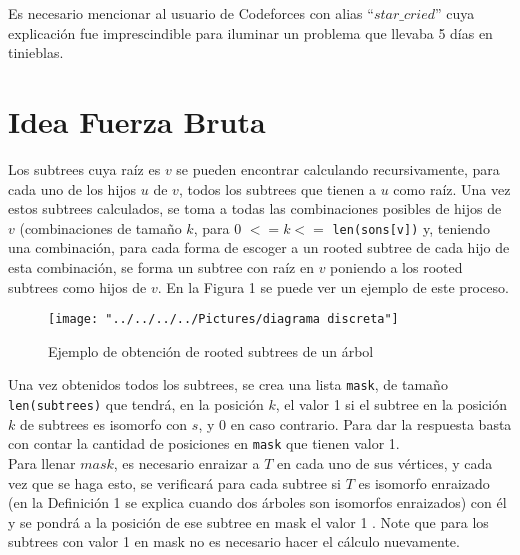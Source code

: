 \documentclass[a4paper,12pt,twocolumn]{article}
\begin{document}
  Es necesario mencionar al usuario de Codeforces con alias $“star\_cried”$ cuya explicación fue imprescindible para iluminar un problema que llevaba 5 días en tinieblas.\\
  
  




 
	\section{Idea Fuerza Bruta}
		Los subtrees cuya raíz es $v$ se pueden encontrar calculando recursivamente, para cada uno de los hijos $u$ de $v$, todos los subtrees que tienen a $u$ como raíz. Una vez estos subtrees calculados, se toma a todas las combinaciones posibles de hijos de $v$ (combinaciones de tamaño $k$, para 0 $<= k <=$ \texttt{\ttfamily len(sons[v])} y, teniendo una combinación, para cada forma de escoger a un rooted subtree de cada hijo de esta combinación, se forma un subtree con raíz en $v$ poniendo a los rooted subtrees como hijos de $v$. En la Figura 1 se puede ver un ejemplo de este proceso.
		
		\begin{figure}
			\centering
			\texttt{[image: "../../../../Pictures/diagrama discreta"]}
			\caption[Figura 1]{Ejemplo de obtención de rooted subtrees de un árbol}
			\label{fig:diagrama-discreta}
		\end{figure}
	
	Una vez obtenidos todos los subtrees, se crea una lista \texttt{\ttfamily mask}, de tamaño \texttt{\ttfamily len(subtrees)} que tendrá, en la posición $k$, el valor 1 si el subtree en la posición $k$ de subtrees es isomorfo con $s$, y 0 en caso contrario. Para dar la respuesta basta con contar la cantidad de posiciones en \texttt{\ttfamily mask} que tienen valor 1.\\
	
	Para llenar $mask$, es necesario enraizar a $T$ en cada uno de sus vértices, y cada vez que se haga esto, se verificará para cada subtree si $T$ es isomorfo enraizado (en la Definición 1 se explica cuando dos árboles son isomorfos enraizados) con él y se pondrá a la posición de ese subtree en mask el valor 1 . Note que para los subtrees con valor 1 en mask no es necesario hacer el cálculo nuevamente.\\
	
\end{document}
